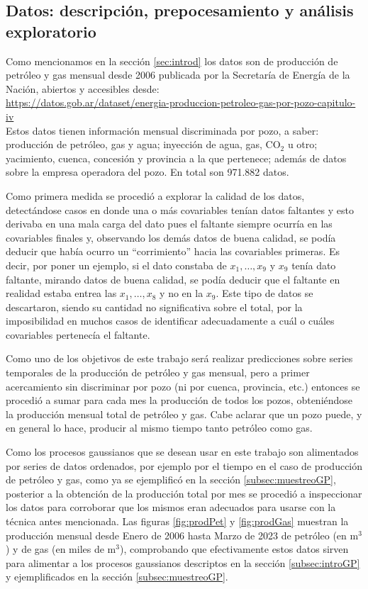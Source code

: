 \documentclass[a4paper]{article}
\begin{document}
\subsection{Datos: descripción, prepocesamiento y análisis exploratorio}
\label{subsec:datosprepoc}
Como mencionamos en la sección \ref{sec:introd} los datos son de producción de petróleo y gas mensual desde 2006 publicada por la Secretaría de Energía de la Nación, abiertos y accesibles desde:\\

\url{https://datos.gob.ar/dataset/energia-produccion-petroleo-gas-por-pozo-capitulo-iv}\\

Estos datos tienen información mensual discriminada por pozo, a saber: producción de petróleo, gas y agua; inyección de agua, gas, CO$_2$ u otro; yacimiento, cuenca, concesión y provincia a la que pertenece; además de datos sobre la empresa operadora del pozo. En total son 971.882 datos.

Como primera medida se procedió a explorar la calidad de los datos, detectándose casos en donde una o más covariables tenían datos faltantes y esto derivaba en una mala carga del dato pues el faltante siempre ocurría en las covariables finales y, observando los demás datos de buena calidad, se podía deducir que había ocurro un ``corrimiento'' hacia las covariables primeras. Es decir, por poner un ejemplo, si el dato constaba de $x_1,\dots,x_9$ y $x_9$ tenía dato faltante, mirando datos de buena calidad, se podía deducir que el faltante en realidad estaba entrea las $x_1,\dots,x_8$ y no en la $x_9$. Este tipo de datos se descartaron, siendo su cantidad no significativa sobre el total, por la imposibilidad en muchos casos de identificar adecuadamente a cuál o cuáles covariables pertenecía el faltante.

Como uno de los objetivos de este trabajo será realizar predicciones sobre series temporales de la producción de petróleo y gas mensual, pero a primer acercamiento sin discriminar por pozo (ni por cuenca, provincia, etc.) entonces se procedió a sumar para cada mes la producción de todos los pozos, obteniéndose la producción mensual total de petróleo y gas. Cabe aclarar que un pozo puede, y en general lo hace, producir al mismo tiempo tanto petróleo como gas.

Como los procesos gaussianos que se desean usar en este trabajo son alimentados por series de datos ordenados, por ejemplo por el tiempo en el caso de producción de petróleo y gas, como ya se ejemplificó en la sección \ref{subsec:muestreoGP}, posterior a la obtención de la producción total por mes se procedió a inspeccionar los datos para corroborar que los mismos eran adecuados para usarse con la técnica antes mencionada. Las figuras \ref{fig:prodPet} y \ref{fig:prodGas} muestran la producción mensual desde Enero de 2006 hasta Marzo de 2023 de petróleo (en m$^3$) y de gas (en miles de m$^3$), comprobando que efectivamente estos datos sirven para alimentar a los procesos gaussianos descriptos en la sección \ref{subsec:introGP} y ejemplificados en la sección \ref{subsec:muestreoGP}.
\end{document}
